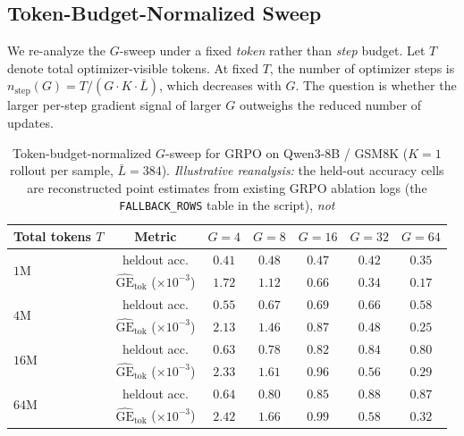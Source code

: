\documentclass{article}
\begin{document}
\subsection{Token-Budget-Normalized Sweep}

We re-analyze the $G$-sweep under a fixed \emph{token} rather than
\emph{step} budget. Let $T$ denote total optimizer-visible tokens.
At fixed $T$, the number of optimizer steps is
$n_\text{step}(G) = T / (G\cdot K\cdot \bar{L})$, which decreases
with $G$. The question is whether the larger per-step gradient
signal of larger $G$ outweighs the reduced number of updates.

\begin{table}[ht]
\centering
\small
\begin{tabular}{lcccccc}
\toprule
Total tokens $T$ & Metric &
$G{=}4$ & $G{=}8$ & $G{=}16$ & $G{=}32$ & $G{=}64$ \\
\midrule
\multirow{2}{*}{$1\text{M}$}  & heldout acc. & $0.41$ & $\mathbf{0.48}$ & $0.47$ & $0.42$ & $0.35$ \\
                               & $\widehat{\mathrm{GE}}_{\text{tok}}$ ($\times 10^{-3}$) & $\mathbf{1.72}$ & $1.12$ & $0.66$ & $0.34$ & $0.17$ \\
\multirow{2}{*}{$4\text{M}$}  & heldout acc. & $0.55$ & $0.67$ & $\mathbf{0.69}$ & $0.66$ & $0.58$ \\
                               & $\widehat{\mathrm{GE}}_{\text{tok}}$ ($\times 10^{-3}$) & $\mathbf{2.13}$ & $1.46$ & $0.87$ & $0.48$ & $0.25$ \\
\multirow{2}{*}{$16\text{M}$} & heldout acc. & $0.63$ & $0.78$ & $0.82$ & $\mathbf{0.84}$ & $0.80$ \\
                               & $\widehat{\mathrm{GE}}_{\text{tok}}$ ($\times 10^{-3}$) & $\mathbf{2.33}$ & $1.61$ & $0.96$ & $0.56$ & $0.29$ \\
\multirow{2}{*}{$64\text{M}$} & heldout acc. & $0.64$ & $0.80$ & $0.85$ & $\mathbf{0.88}$ & $0.87$ \\
                               & $\widehat{\mathrm{GE}}_{\text{tok}}$ ($\times 10^{-3}$) & $\mathbf{2.42}$ & $1.66$ & $0.99$ & $0.58$ & $0.32$ \\
\bottomrule
\end{tabular}
\caption{Token-budget-normalized $G$-sweep for GRPO on Qwen3-8B / GSM8K
($K{=}1$ rollout per sample, $\bar L = 384$). \emph{Illustrative reanalysis:}
the held-out accuracy cells are reconstructed point estimates from existing GRPO
ablation logs (the \texttt{FALLBACK\_ROWS} table in the script), \emph{not}
}
\end{table}
\end{document}
